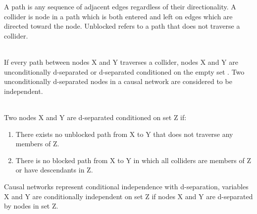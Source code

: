 \documentclass{article}
\begin{document}
A path is any sequence of adjacent edges regardless of their directionality. A collider is node in a path which is both entered and left on edges which are directed toward the node. Unblocked refers to a path that does not traverse a collider\cite{pearl2003causality}.
\\

\\

If every path between nodes X and Y traverses a collider, nodes X and Y are unconditionally d-separated or d-separated conditioned on the empty set \cite{pearl2003causality}. Two unconditionally d-separated nodes in a causal network are considered to be independent\cite{pearl2009}.
\\

\\


Two nodes X and Y are d-separated conditioned on set Z if:
\begin{enumerate}
	\item There exists no unblocked path from X to Y that does not traverse any members of Z.\cite{pearl2003causality}
	\item There is no blocked path from X to Y in which all colliders are members of Z or have descendants in Z.\cite{pearl2003causality}
\end{enumerate} 

Causal networks represent conditional independence with d-separation, variables X and Y are conditionally independent on set Z if nodes X and Y are d-separated by nodes in set Z\cite{verma1990causal}.
\\
\end{document}
